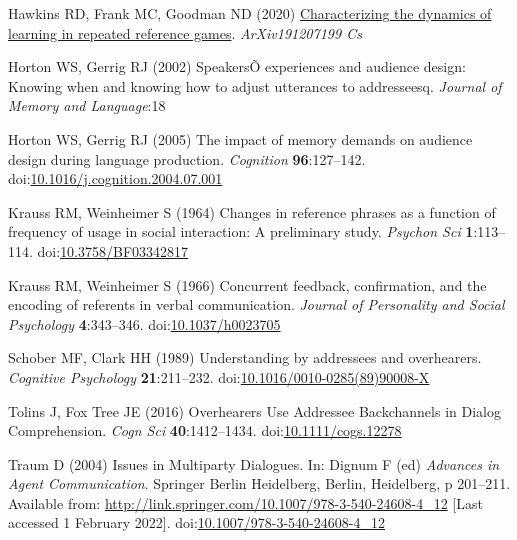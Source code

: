\documentclass[
  english,
  a4paper,
]{article}
\newlength{\cslhangindent}
\newlength{\cslentryspacingunit} %
\newenvironment{CSLReferences}[2] %
 {%
  \setlength{\parindent}{0pt}
  \ifodd #1
  \let\oldpar\par
  \def\par{\hangindent=\cslhangindent\oldpar}
  \fi
  \setlength{\parskip}{#2\cslentryspacingunit}
 }%
 {}
\begin{document}
\begin{CSLReferences}{1}{0}
\leavevmode{}%
Hawkins RD, Frank MC, Goodman ND (2020) \href{http://arxiv.org/abs/1912.07199}{Characterizing the dynamics of learning in repeated reference games}. \emph{ArXiv191207199 Cs}

\leavevmode{}%
Horton WS, Gerrig RJ (2002) {SpeakersÕ} experiences and audience design: Knowing when and knowing how to adjust utterances to addresseesq. \emph{Journal of Memory and Language}:18

\leavevmode{}%
Horton WS, Gerrig RJ (2005) The impact of memory demands on audience design during language production. \emph{Cognition} \textbf{96}:127--142. doi:\href{https://doi.org/10.1016/j.cognition.2004.07.001}{10.1016/j.cognition.2004.07.001}

\leavevmode{}%
Krauss RM, Weinheimer S (1964) Changes in reference phrases as a function of frequency of usage in social interaction: A preliminary study. \emph{Psychon Sci} \textbf{1}:113--114. doi:\href{https://doi.org/10.3758/BF03342817}{10.3758/BF03342817}

\leavevmode{}%
Krauss RM, Weinheimer S (1966) Concurrent feedback, confirmation, and the encoding of referents in verbal communication. \emph{Journal of Personality and Social Psychology} \textbf{4}:343--346. doi:\href{https://doi.org/10.1037/h0023705}{10.1037/h0023705}

\leavevmode{}%
Schober MF, Clark HH (1989) Understanding by addressees and overhearers. \emph{Cognitive Psychology} \textbf{21}:211--232. doi:\href{https://doi.org/10.1016/0010-0285(89)90008-X}{10.1016/0010-0285(89)90008-X}

\leavevmode{}%
Tolins J, Fox Tree JE (2016) Overhearers {Use Addressee Backchannels} in {Dialog Comprehension}. \emph{Cogn Sci} \textbf{40}:1412--1434. doi:\href{https://doi.org/10.1111/cogs.12278}{10.1111/cogs.12278}

\leavevmode{}%
Traum D (2004) Issues in {Multiparty Dialogues}. In: Dignum F (ed) \emph{Advances in {Agent Communication}}. {Springer Berlin Heidelberg}, {Berlin, Heidelberg}, p 201--211. Available from: \url{http://link.springer.com/10.1007/978-3-540-24608-4_12} {[}Last accessed 1 February 2022{]}. doi:\href{https://doi.org/10.1007/978-3-540-24608-4_12}{10.1007/978-3-540-24608-4\_12}


\end{CSLReferences}
\end{document}
